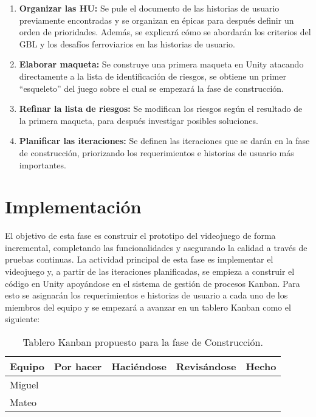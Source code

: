 \begin{enumerate}
  \item \textbf{Organizar las HU:} Se pule el documento de las historias de usuario previamente encontradas y se organizan en épicas para después definir un orden de prioridades. Además, se explicará cómo se abordarán los criterios del GBL y los desafíos ferroviarios en las historias de usuario.
  \item \textbf{Elaborar maqueta:} Se construye una primera maqueta en Unity atacando directamente a la lista de identificación de riesgos, se obtiene un primer “esqueleto” del juego sobre el cual se empezará la fase de construcción.
  \item \textbf{Refinar la lista de riesgos:} Se modifican los riesgos según el resultado de la primera maqueta, para después investigar posibles soluciones.
  \item \textbf{Planificar las iteraciones:} Se definen las iteraciones que se darán en la fase de construcción, priorizando los requerimientos e historias de usuario más importantes.
\end{enumerate}

\section{Implementación}

El objetivo de esta fase es construir el prototipo del videojuego de forma incremental, completando las funcionalidades y asegurando la calidad a través de pruebas continuas. La actividad principal de esta fase es implementar el videojuego y, a partir de las iteraciones planificadas, se empieza a construir el código en Unity apoyándose en el sistema de gestión de procesos Kanban. Para esto se asignarán los requerimientos e historias de usuario a cada uno de los miembros del equipo y se empezará a avanzar en un tablero Kanban como el siguiente:

\begin{table}[H]\centering
\caption{Tablero Kanban propuesto para la fase de Construcción.}
\label{tab:kanban-construccion}
\begin{tabular}{@{}lcccc@{}}
\toprule
\textbf{Equipo} & \textbf{Por hacer} & \textbf{Haciéndose} & \textbf{Revisándose} & \textbf{Hecho} \\
\midrule
Miguel & & & & \\
Mateo  & & & & \\
\bottomrule
\end{tabular}
\end{table}

